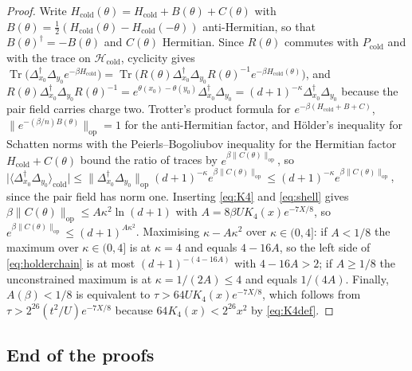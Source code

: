 \documentclass[11pt]{article}
\theoremstyle{plain}
\theoremstyle{definition}
\DeclareMathOperator{\Tr}{Tr}
\newcommand{\Dop}{\Delta}
\begin{document}
\begin{proof}
Write $H_{\mathrm{cold}}(\theta)=H_{\mathrm{cold}}+B(\theta)+C(\theta)$ with
$B(\theta)=\tfrac12(H_{\mathrm{cold}}(\theta)-H_{\mathrm{cold}}(-\theta))$
anti-Hermitian, so that $B(\theta)^\dagger=-B(\theta)$ and $C(\theta)$ Hermitian.
Since $R(\theta)$ commutes with $P_{\mathrm{cold}}$ and with the trace on
$\mathcal{H}_{\mathrm{cold}}$, cyclicity gives
$\Tr\bigl(\Dop_{x_0}^\dagger\Dop_{y_0}e^{-\beta H_{\mathrm{cold}}}\bigr)
=\Tr\bigl(R(\theta)\Dop_{x_0}^\dagger\Dop_{y_0}R(\theta)^{-1}e^{-\beta H_{\mathrm{cold}}(\theta)}\bigr)$,
and $R(\theta)\Dop_{x_0}^\dagger\Dop_{y_0}R(\theta)^{-1}=e^{\theta(x_0)-\theta(y_0)}\Dop^\dagger_{x_0}\Dop_{y_0}
=(d+1)^{-\kappa}\Dop_{x_0}^\dagger\Dop_{y_0}$ because the pair field carries charge
two. Trotter's product formula \cite{trotter1959} for
$e^{-\beta(H_{\mathrm{cold}}+B+C)}$,
$\|e^{-(\beta/n)B(\theta)}\|_{\mathrm{op}}=1$ for the anti-Hermitian factor, and
H\"older's inequality for Schatten norms with the Peierls--Bogoliubov inequality
for the Hermitian factor $H_{\mathrm{cold}}+C(\theta)$ bound the ratio of traces
by $e^{\beta\|C(\theta)\|_{\mathrm{op}}}$, so
$\bigl|\langle\Dop^\dagger_{x_0}\Dop_{y_0}\rangle_{\mathrm{cold}}\bigr|
\le\|\Dop^\dagger_{x_0}\Dop_{y_0}\|_{\mathrm{op}}(d+1)^{-\kappa}
e^{\beta\|C(\theta)\|_{\mathrm{op}}}\le(d+1)^{-\kappa}e^{\beta\|C(\theta)\|_{\mathrm{op}}}$,
since the pair field has norm one. Inserting \eqref{eq:K4} and \eqref{eq:shell}
gives $\beta\|C(\theta)\|_{\mathrm{op}}\le A\kappa^{2}\ln(d+1)$ with $A=8\beta UK_4(x)e^{-7X/8}$,
so $e^{\beta\|C(\theta)\|_{\mathrm{op}}}\le(d+1)^{A\kappa^{2}}$.
Maximising $\kappa-A\kappa^{2}$ over $\kappa\in(0,4]$: if $A<1/8$ the maximum over
$\kappa\in(0,4]$ is at $\kappa=4$ and equals $4-16A$, so the left side of
\eqref{eq:holderchain} is at most $(d+1)^{-(4-16A)}$ with $4-16A>2$; if $A\ge1/8$
the unconstrained maximum is at $\kappa=1/(2A)\le4$ and equals $1/(4A)$. Finally,
$A(\beta)<1/8$ is equivalent to $\tau>64UK_4(x)e^{-7X/8}$, which follows from
$\tau>2^{26}(t^{2}/U)e^{-7X/8}$ because $64K_4(x)<2^{26}x^{2}$ by \eqref{eq:K4def}.
\end{proof}

\subsection{End of the proofs}
\end{document}
